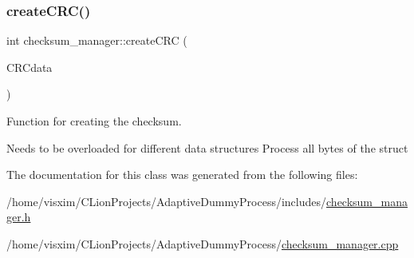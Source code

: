 \subsubsection{\texorpdfstring{create\+C\+R\+C()}{createCRC()}\hspace{0.1cm}{\footnotesize\ttfamily [2/2]}}
{\footnotesize\ttfamily int checksum\+\_\+manager\+::create\+C\+RC (\begin{DoxyParamCaption}\item[{\hyperlink{structEXMPLE__s}{E\+X\+M\+P\+L\+E\+\_\+s} $\ast$}]{C\+R\+Cdata }\end{DoxyParamCaption})}



Function for creating the checksum. 

Needs to be overloaded for different data structures Process all bytes of the struct 

The documentation for this class was generated from the following files\+:\begin{DoxyCompactItemize}
\item 
/home/visxim/\+C\+Lion\+Projects/\+Adaptive\+Dummy\+Process/includes/\hyperlink{checksum__manager_8h}{checksum\+\_\+manager.\+h}\item 
/home/visxim/\+C\+Lion\+Projects/\+Adaptive\+Dummy\+Process/\hyperlink{checksum__manager_8cpp}{checksum\+\_\+manager.\+cpp}\end{DoxyCompactItemize}
